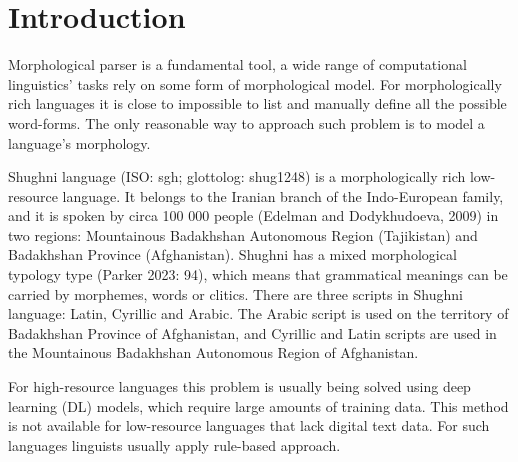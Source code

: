 \section{Introduction}

\par Morphological parser is a fundamental tool, a wide range of computational linguistics' tasks rely on some form of morphological model. For morphologically rich languages it is close to impossible to list and manually define all the possible word-forms. The only reasonable way to approach such problem is to model a language's morphology. 
\par Shughni language (ISO: sgh; glottolog: shug1248) is a morphologically rich low-resource language. It belongs to the Iranian branch of the Indo-European family, and it is spoken by circa 100 000 people (Edelman and Dodykhudoeva, 2009) in two regions: Mountainous Badakhshan Autonomous Region (Tajikistan) and Badakhshan Province (Afghanistan). Shughni has a mixed morphological typology type (Parker 2023: 94), which means that grammatical meanings can be carried by morphemes, words or clitics. There are three scripts in Shughni language: Latin, Cyrillic and Arabic. The Arabic script is used on the territory of Badakhshan Province of Afghanistan, and Cyrillic and Latin scripts are used in the Mountainous Badakhshan Autonomous Region of Afghanistan.
\par {}
\par For high-resource languages this problem is usually being solved using deep learning (DL) models, which require large amounts of training data. This method is not available for low-resource languages that lack digital text data. For such languages linguists usually apply rule-based approach.